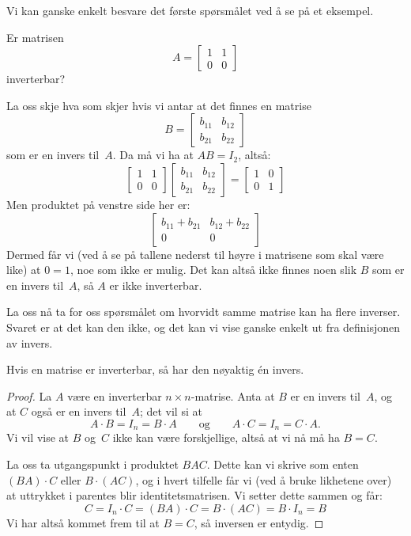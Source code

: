 Vi kan ganske enkelt besvare det første spørsmålet ved å se på et
eksempel.

\begin{ex}
Er matrisen
\[
A =
\begin{bmatrix}
1 & 1 \\
0 & 0
\end{bmatrix}
\]
inverterbar?

La oss skje hva som skjer hvis vi antar at det finnes en matrise
\[
B =
\begin{bmatrix}
b_{11} & b_{12} \\
b_{21} & b_{22}
\end{bmatrix}
\]
som er en invers til~$A$.  Da må vi ha at $AB = I_2$, altså:
\[
\begin{bmatrix}
1 & 1 \\
0 & 0
\end{bmatrix}
\begin{bmatrix}
b_{11} & b_{12} \\
b_{21} & b_{22}
\end{bmatrix}
=
\begin{bmatrix}
1 & 0 \\
0 & 1
\end{bmatrix}
\]
Men produktet på venstre side her er:
\[
\begin{bmatrix}
b_{11} + b_{21} & b_{12} + b_{22} \\
0               & 0
\end{bmatrix}
\]
Dermed får vi (ved å se på tallene nederst til høyre i matrisene som
skal være like) at $0 = 1$, noe som ikke er mulig.  Det kan altså ikke
finnes noen slik $B$ som er en invers til~$A$, så $A$ er ikke
inverterbar.
\end{ex}

La oss nå ta for oss spørsmålet om hvorvidt samme matrise kan ha flere
inverser.  Svaret er at det kan den ikke, og det kan vi vise ganske
enkelt ut fra definisjonen av invers.

\begin{thm}
Hvis en matrise er inverterbar, så har den nøyaktig én invers.
\end{thm}
\begin{proof}
La $A$ være en inverterbar $n \times n$-matrise.  Anta at $B$ er en
invers til~$A$, og at $C$ også er en invers til~$A$; det vil si at
\[
A \cdot B = I_n = B \cdot A
\qquad\text{og}\qquad
A \cdot C = I_n = C \cdot A.
\]
Vi vil vise at $B$ og~$C$ ikke kan være forskjellige, altså at vi nå
må ha $B = C$.

La oss ta utgangspunkt i produktet $BAC$.  Dette kan vi skrive som
enten $(BA) \cdot C$ eller $B \cdot (AC)$, og i hvert tilfelle får vi
(ved å bruke likhetene over) at uttrykket i parentes blir
identitetsmatrisen.  Vi setter dette sammen og får:
\[
C
 = I_n \cdot C
 = (BA) \cdot C
 = B \cdot (AC)
 = B \cdot I_n
 = B
\]
Vi har altså kommet frem til at $B = C$, så inversen er entydig.
\end{proof}

